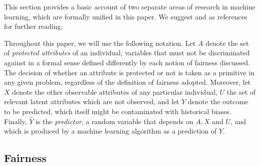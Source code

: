 

This section provides a basic account of two separate areas of
research in machine learning, which are formally unified in this
paper. We suggest \citet{berk:17} and \citet{pearl:16} as references for
further reading.

Throughout this paper, we will use the following notation.  Let $A$
denote the set of {\it protected attributes} of an individual,
variables that must not be discriminated against in a formal sense
defined differently by each notion of fairness discussed. The decision
of whether an attribute is protected or not is taken as a primitive in
any given problem, regardless of the definition of fairness
adopted. Moreover, let $X$ denote the other observable attributes of any
particular individual, $U$ the set of relevant latent attributes
which are not observed, and let
$Y$ denote the outcome to be predicted, which itself might be contaminated
with historical biases. Finally, $\hat Y$ is the {\it predictor}, a
random variable that depends on $A, X$ and $U$, and which is produced by
a machine learning algorithm as a prediction of $Y$.

\subsection{Fairness}

